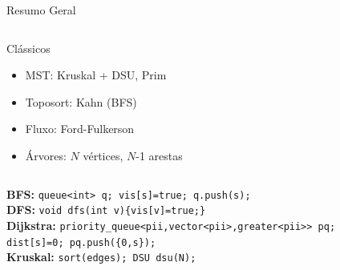 \documentclass[aspectratio=169,10pt]{beamer}
\begin{document}
\begin{frame}[shrink=2]{Resumo Geral}
\begin{columns}[t]
\begin{block}{Clássicos}
\begin{itemize}
          \item MST: Kruskal + DSU, Prim
          \item Toposort: Kahn (BFS)
          \item Fluxo: Ford-Fulkerson
          \item Árvores: $N$ vértices, $N$-1 arestas
        \end{itemize}
      \end{block}
    \end{columns}
  \vspace{0.10cm}
  \begin{columns}[t]
      \begin{tcolorbox}[caixaAzul,title={Templates Mentais}]
        \footnotesize
        \textbf{BFS:}
        \texttt{queue<int> q; vis[s]=true; q.push(s);}\\[2pt]
        \textbf{DFS:}
        \texttt{void dfs(int v)\{vis[v]=true;\}}\\[2pt]
        \textbf{Dijkstra:}
        \texttt{priority\_queue<pii,vector<pii>,greater<pii>> pq;}\\
        \texttt{dist[s]=0; pq.push(\{0,s\});}\\[2pt]
        \textbf{Kruskal:}
        \texttt{sort(edges); DSU dsu(N);}
      \end{tcolorbox}
  \end{columns}
\end{frame}
\end{document}
